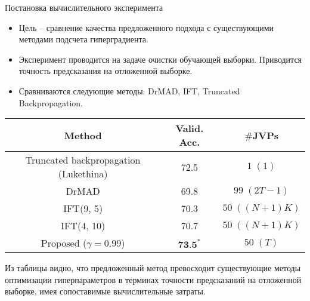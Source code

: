 \documentclass[aspectratio=169]{beamer}
\begin{document}
\begin{frame}{Постановка вычислительного эксперимента}
  \begin{itemize}
    \item Цель -- сравнение качества предложенного подхода с существующими методами подсчета гиперградиента.
    \item Эксперимент проводится на задаче очистки обучающей выборки. Приводится точность предсказания на отложенной выборке.
    \item Сравниваются следующие методы: DrMAD, IFT, Truncated Backpropagation.
  \end{itemize}

  \begin{table}[h]
    \centering
    \begin{tabular}{c|c|c}
        \textbf{Method} & \textbf{Valid. Acc.} & $\#$\textbf{JVPs} \\ \hline
        Truncated backpropagation (Lukethina) & 72.5 & $1 \; (1)$ \\
        DrMAD & 69.8 & $99 \; (2T - 1)$ \\
        IFT(9, 5) & 70.3 & $50 \;  ((N + 1)K)$ \\
        IFT(4, 10) & 70.7 & $50 \; ((N + 1)K)$ \\
        Proposed ($\gamma = 0.99$) & $\textbf{73.5}^*$ & $50 \; (T)$ \\ \hline
    \end{tabular}
\end{table}
Из таблицы видно, что предложенный метод превосходит существующие методы оптимизации гиперпараметров в терминах 
точности предсказаний на отложенной выборке, имея сопоставимые вычислительные затраты.
\end{frame}







\end{document}
